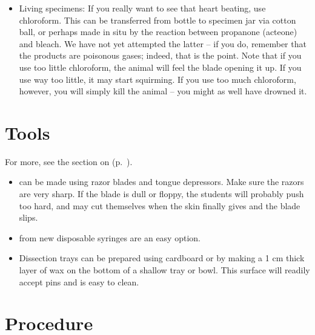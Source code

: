\begin{itemize}
\item{Living specimens: 
If you really want to see that heart beating, use chloroform. 
This can be transferred from bottle to specimen jar via cotton ball, 
or perhaps made in situ by the reaction between propanone (acteone) and bleach. 
We have not yet attempted the latter – 
if you do, remember that the products are poisonous gases; 
indeed, that is the point. Note that if you use too little chloroform, 
the animal will feel the blade opening it up. 
If you use way too little, it may start squirming. 
If you use too much chloroform, however, you will simply kill the animal – 
you might as well have drowned it.}

\end{itemize}

\section{Tools}
For more, see the section on  (p.~\pageref{cha:labequip}).

\begin{itemize}

\item{ can be made using razor blades and tongue depressors. Make sure the razors are very sharp. If the blade is dull or floppy, the students will probably push too hard, 
and may cut themselves when the skin finally gives and the blade slips.}

\item{ from new disposable syringes are an easy option.}

\item{Dissection trays can be prepared 
using cardboard or by making a 1 cm thick layer of wax on the bottom of a shallow tray or bowl. 
This surface will readily accept pins and is easy to clean.}

\end{itemize}

\section{Procedure}

